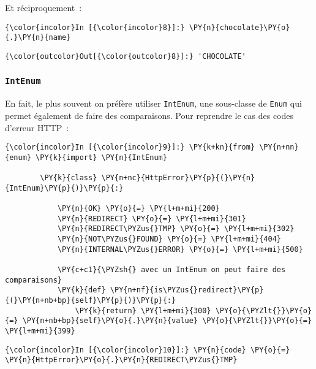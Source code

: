     Et réciproquement~:

    \begin{Verbatim}[commandchars=\\\{\}]
{\color{incolor}In [{\color{incolor}8}]:} \PY{n}{chocolate}\PY{o}{.}\PY{n}{name}
\end{Verbatim}


\begin{Verbatim}[commandchars=\\\{\}]
{\color{outcolor}Out[{\color{outcolor}8}]:} 'CHOCOLATE'
\end{Verbatim}
            
    \hypertarget{intenum}{%
\subsubsection{\texorpdfstring{\texttt{IntEnum}}{IntEnum}}\label{intenum}}

    En fait, le plus souvent on préfère utiliser \texttt{IntEnum}, une
sous-classe de \texttt{Enum} qui permet également de faire des
comparaisons. Pour reprendre le cas des codes d'erreur HTTP~:

    \begin{Verbatim}[commandchars=\\\{\}]
{\color{incolor}In [{\color{incolor}9}]:} \PY{k+kn}{from} \PY{n+nn}{enum} \PY{k}{import} \PY{n}{IntEnum}
        
        \PY{k}{class} \PY{n+nc}{HttpError}\PY{p}{(}\PY{n}{IntEnum}\PY{p}{)}\PY{p}{:}
        
            \PY{n}{OK} \PY{o}{=} \PY{l+m+mi}{200}
            \PY{n}{REDIRECT} \PY{o}{=} \PY{l+m+mi}{301}
            \PY{n}{REDIRECT\PYZus{}TMP} \PY{o}{=} \PY{l+m+mi}{302}
            \PY{n}{NOT\PYZus{}FOUND} \PY{o}{=} \PY{l+m+mi}{404}
            \PY{n}{INTERNAL\PYZus{}ERROR} \PY{o}{=} \PY{l+m+mi}{500}
        
            \PY{c+c1}{\PYZsh{} avec un IntEnum on peut faire des comparaisons}
            \PY{k}{def} \PY{n+nf}{is\PYZus{}redirect}\PY{p}{(}\PY{n+nb+bp}{self}\PY{p}{)}\PY{p}{:}
                \PY{k}{return} \PY{l+m+mi}{300} \PY{o}{\PYZlt{}}\PY{o}{=} \PY{n+nb+bp}{self}\PY{o}{.}\PY{n}{value} \PY{o}{\PYZlt{}}\PY{o}{=} \PY{l+m+mi}{399}
\end{Verbatim}


    \begin{Verbatim}[commandchars=\\\{\}]
{\color{incolor}In [{\color{incolor}10}]:} \PY{n}{code} \PY{o}{=} \PY{n}{HttpError}\PY{o}{.}\PY{n}{REDIRECT\PYZus{}TMP}
\end{Verbatim}


